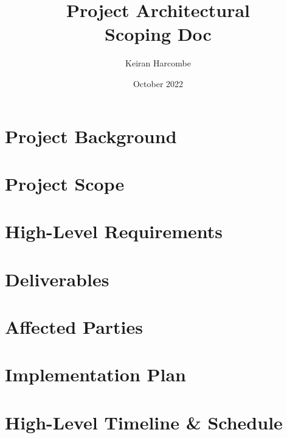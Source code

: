 \documentclass[a4paper]{article}
\title{Project Architectural \\ Scoping Doc}
\author{Keiran Harcombe}
\date{October 2022}
\begin{document}
	\maketitle
	
\section{Project Background} %

\section{Project Scope} %

\section{High-Level Requirements} %

\section{Deliverables} %

\section{Affected Parties} 

\section{Implementation Plan}

\section{High-Level Timeline \& Schedule}
\end{document}
